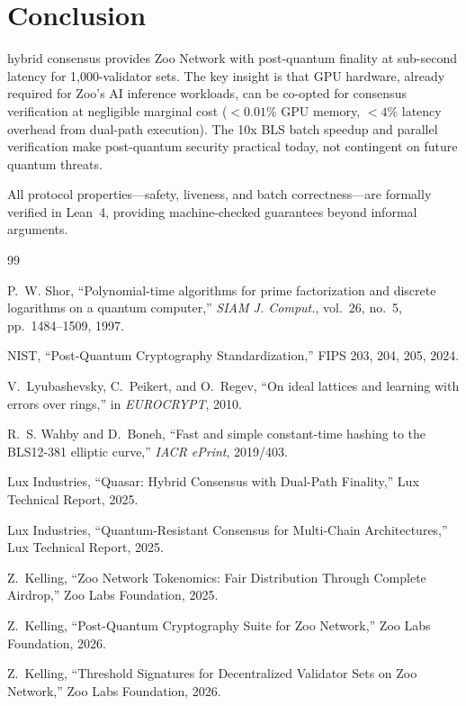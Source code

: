 \section{Conclusion}


\Quasar{} hybrid consensus provides Zoo Network with post-quantum finality at sub-second latency for 1,000-validator sets. The key insight is that GPU hardware, already required for Zoo's AI inference workloads, can be co-opted for consensus verification at negligible marginal cost ($< 0.01\%$ GPU memory, $< 4\%$ latency overhead from dual-path execution). The 10x BLS batch speedup and parallel \Corona{} verification make post-quantum security practical today, not contingent on future quantum threats.

All protocol properties---safety, liveness, and batch correctness---are formally verified in Lean~4, providing machine-checked guarantees beyond informal arguments.

\begin{thebibliography}{99}

P.~W. Shor, ``Polynomial-time algorithms for prime factorization and discrete logarithms on a quantum computer,'' \textit{SIAM J. Comput.}, vol.~26, no.~5, pp.~1484--1509, 1997.

NIST, ``Post-Quantum Cryptography Standardization,'' FIPS 203, 204, 205, 2024.

V.~Lyubashevsky, C.~Peikert, and O.~Regev, ``On ideal lattices and learning with errors over rings,'' in \textit{EUROCRYPT}, 2010.

R.~S. Wahby and D.~Boneh, ``Fast and simple constant-time hashing to the BLS12-381 elliptic curve,'' \textit{IACR ePrint}, 2019/403.

Lux Industries, ``Quasar: Hybrid Consensus with Dual-Path Finality,'' Lux Technical Report, 2025.

Lux Industries, ``Quantum-Resistant Consensus for Multi-Chain Architectures,'' Lux Technical Report, 2025.

Z.~Kelling, ``Zoo Network Tokenomics: Fair Distribution Through Complete Airdrop,'' Zoo Labs Foundation, 2025.

Z.~Kelling, ``Post-Quantum Cryptography Suite for Zoo Network,'' Zoo Labs Foundation, 2026.

Z.~Kelling, ``Threshold Signatures for Decentralized Validator Sets on Zoo Network,'' Zoo Labs Foundation, 2026.

\end{thebibliography}

